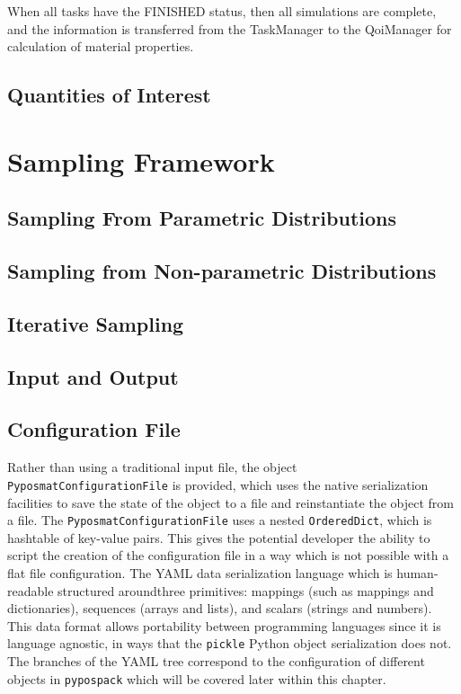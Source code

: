 When all tasks have the FINISHED status, then all simulations are complete, and the information is transferred from the TaskManager to the QoiManager for calculation of material properties.
\subsection{Quantities of Interest}

\section{Sampling Framework}
\subsection{Sampling From Parametric Distributions}
\subsection{Sampling from Non-parametric Distributions}
\subsection{Iterative Sampling}

\subsection{Input and Output}

\subsection{Configuration File}
Rather than using a traditional input file, the object \verb|PyposmatConfigurationFile| is provided, which uses the native serialization facilities to save the state of the object to a file and reinstantiate the object from a file.  The \verb|PyposmatConfigurationFile| uses a nested \verb|OrderedDict|, which is hashtable of key-value pairs.  This gives the potential developer the ability to script the creation of the configuration file in a way which is not possible with a flat file configuration.  The YAML data serialization language\cite{yaml_version_1_2r} which is human-readable structured aroundthree primitives: mappings (such as mappings and dictionaries), sequences (arrays and lists), and scalars (strings and numbers).  This data format allows portability between programming languages since it is language agnostic, in ways that the \verb|pickle| Python object serialization does not.  The branches of the YAML tree correspond to the configuration of different objects in \verb|pypospack| which will be covered later within this chapter.

